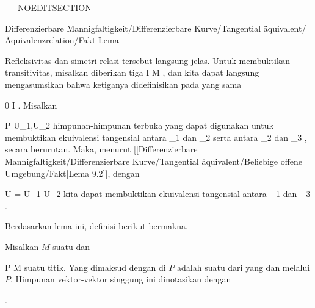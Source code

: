 __NOEDITSECTION__

{Differenzierbare Mannigfaltigkeit/Differenzierbare Kurve/Tangential äquivalent/Äquivalenzrelation/Fakt}
{Lema}
{}
{

\faktzusatz {}
\faktzusatz {}

}
{

Refleksivitas dan simetri relasi tersebut langsung jelas. Untuk membuktikan transitivitas, misalkan diberikan tiga
 { I } { M
} {}
,
dan kita dapat langsung mengasumsikan bahwa ketiganya didefinisikan pada
yang sama

\mavergleichskette
{\vergleichskette
{ 0
}
{ \in }{ I
}
{ \subseteq }{\R
}
{    }{
}
{   }{
}
}
{}{}{}
.
Misalkan

\mavergleichskette
{\vergleichskette
{P
}
{ \in }{ U_1,U_2
}
{  }{
}
{    }{
}
{   }{
}
}
{}{}{}
himpunan-himpunan terbuka yang dapat digunakan untuk membuktikan ekuivalensi tangensial antara
\mathkor {} {\gamma_1} {dan} {\gamma_2} {}
serta antara
\mathkor {} {\gamma_2} {dan} {\gamma_3} {}
,
secara berurutan. Maka, menurut
[[Differenzierbare Mannigfaltigkeit/Differenzierbare Kurve/Tangential äquivalent/Beliebige offene Umgebung/Fakt|Lema 9.2]],
dengan

\mavergleichskette
{\vergleichskette
{U
}
{ = }{ U_1 \cap U_2
}
{  }{
}
{    }{
}
{   }{
}
}
{}{}{}
kita dapat membuktikan ekuivalensi tangensial antara
\mathkor {} {\gamma_1} {dan} {\gamma_3} {}
.

}

Berdasarkan lema ini, definisi berikut bermakna.

{}
{

Misalkan $M$ suatu
dan

\mavergleichskette
{\vergleichskette
{ P
}
{ \in }{ M
}
{  }{
}
{    }{
}
{   }{
}
}
{}{}{}
suatu titik. Yang dimaksud dengan  di $P$ adalah suatu
dari
yang
dan melalui $P$. Himpunan vektor-vektor singgung ini dinotasikan dengan

 {  }

.

}

